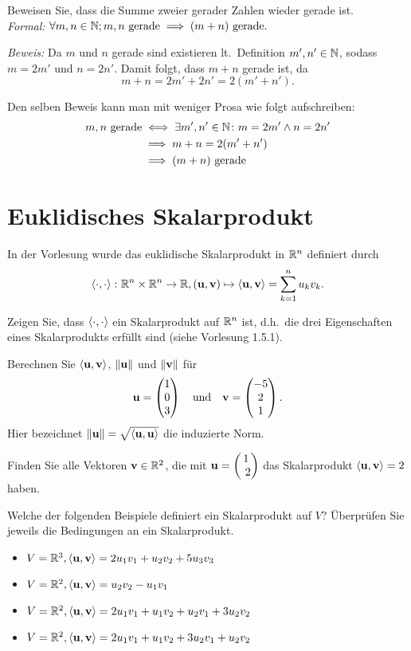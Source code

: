 \documentclass{scrartcl}
\newcommand{\uu}{\mat u}
\newcommand{\vv}{\mat v}
\begin{document}
\begin{solution}[Beispiel]
  Beweisen Sie, dass die Summe zweier gerader Zahlen wieder gerade ist.\\

  \emph{Formal:} $\forall m, n \in \NN; m, n \mbox{ gerade} \implies (m + n) \mbox{ gerade}.$

  \emph{Beweis:} Da $m$ und $n$ gerade sind existieren lt.\ Definition $m', n' \in \NN$, sodass $m = 2m'$ und $n = 2n'$. Damit folgt, dass $m + n$ gerade ist, da
  \[
    m + n = 2m' + 2n' = 2 (m' + n').
  \]

  Den selben Beweis kann man mit weniger Prosa wie folgt aufschreiben:
  \begin{align*}
    m, n \mbox{ gerade}
    &\iff \exists m', n' \in \NN\colon m = 2m' \land n = 2n' \\
    &\implies m + n = 2 (m' + n') \\
    &\implies (m + n) \mbox{ gerade}
  \end{align*}
\end{solution}


\section{Euklidisches Skalarprodukt }
In der Vorlesung wurde das euklidische Skalarprodukt in $\RR^n$ definiert durch
\[
  \sp{\cdot}{\cdot} \colon \RR^n \times \RR^n \to \RR, (\uu, \vv) \mapsto \sp{\uu}{\vv} = \sum_{k=1}^n u_k v_k.
\]
\begin{subex}
  \item{} Zeigen Sie, dass $\sp{\cdot}{\cdot}$ ein Skalarprodukt auf $\RR^n$ ist, d.h.\ die drei Eigenschaften eines Skalarprodukts erfüllt sind (siehe Vorlesung 1.5.1).
  \item{} Berechnen Sie $\sp{\uu}{\vv}$, $\norm{\uu}$ und $\norm{\vv}$ für
  \[
    \uu = \colvec{1 \\ 0 \\ 3} \quad\mbox{und}\quad \vv = \colvec{-5 \\ 2 \\ 1}.
  \]
  Hier bezeichnet $\norm{\uu} = \sqrt{\sp{\uu}{\uu}}$ die induzierte Norm.
  \item{} Finden Sie alle Vektoren $\vv \in \RR^2$, die mit $\uu = \colvec{1 \\ 2}$ das Skalarprodukt $\sp{\uu}{\vv} = 2$ haben.
  \item{} Welche der folgenden Beispiele definiert ein Skalarprodukt auf $V$?
  Überprüfen Sie jeweils die Bedingungen an ein Skalarprodukt.
  \begin{itemize}
    \item $V = \RR^3, \sp{\uu}{\vv} = 2u_1 v_1 +u_2 v_2 +5u_3 v_3$
    \item $V = \RR^2, \sp{\uu}{\vv} = u_2 v_2 - u_1 v_1$
    \item $V =\RR^2, \sp{\uu}{\vv} = 2u_1 v_1 + u_1 v_2 + u_2 v_1 + 3u_2 v_2$
    \item $V =\RR^2, \sp{\uu}{\vv} = 2u_1 v_1 + u_1 v_2 + 3u_2 v_1 + u_2 v_2$
  \end{itemize}
\end{subex}
\end{document}
